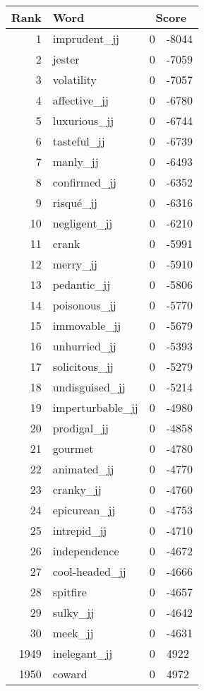 \begin{longtable}[!htbp]{| rlr@{.}l |}
    \hline
    \textbf{Rank} & \textbf{Word} & \multicolumn{2}{c|}{\textbf{Score}} \\
    \hline
    \endhead
    1 & imprudent\_jj & 0 & -8044 \\
    2 & jester & 0 & -7059 \\
    3 & volatility & 0 & -7057 \\
    4 & affective\_jj & 0 & -6780 \\
    5 & luxurious\_jj & 0 & -6744 \\
    6 & tasteful\_jj & 0 & -6739 \\
    7 & manly\_jj & 0 & -6493 \\
    8 & confirmed\_jj & 0 & -6352 \\
    9 & risqué\_jj & 0 & -6316 \\
    10 & negligent\_jj & 0 & -6210 \\
    11 & crank & 0 & -5991 \\
    12 & merry\_jj & 0 & -5910 \\
    13 & pedantic\_jj & 0 & -5806 \\
    14 & poisonous\_jj & 0 & -5770 \\
    15 & immovable\_jj & 0 & -5679 \\
    16 & unhurried\_jj & 0 & -5393 \\
    17 & solicitous\_jj & 0 & -5279 \\
    18 & undisguised\_jj & 0 & -5214 \\
    19 & imperturbable\_jj & 0 & -4980 \\
    20 & prodigal\_jj & 0 & -4858 \\
    21 & gourmet & 0 & -4780 \\
    22 & animated\_jj & 0 & -4770 \\
    23 & cranky\_jj & 0 & -4760 \\
    24 & epicurean\_jj & 0 & -4753 \\
    25 & intrepid\_jj & 0 & -4710 \\
    26 & independence & 0 & -4672 \\
    27 & cool-headed\_jj & 0 & -4666 \\
    28 & spitfire & 0 & -4657 \\
    29 & sulky\_jj & 0 & -4642 \\
    30 & meek\_jj & 0 & -4631 \\
    1949 & inelegant\_jj & 0 & 4922 \\
    1950 & coward & 0 & 4972 \\

\end{longtable}
